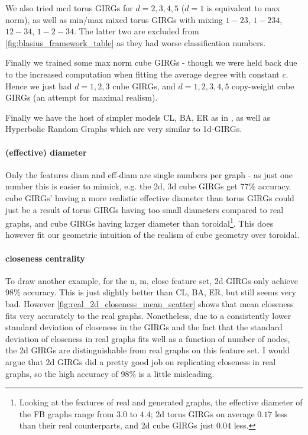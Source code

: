 We also tried mcd torus GIRGs for $d=2,3,4,5$ ($d=1$ is equivalent to max norm), as well as min/max mixed torus GIRGs with mixing $1-23$, $1-234$, $12-34$, $1-2-34$. The latter two are excluded from \cref{fig:blasius_framework_table} as they had worse classification numbers.

Finally we trained some max norm cube GIRGs - though we were held back due to the increased computation when fitting the average degree with constant $c$. Hence we just had $d=1,2,3$ cube GIRGs, and $d=1,2,3,4,5$ copy-weight cube GIRGs (an attempt for maximal realism).

Finally we have the host of simpler models CL, BA, ER as in \cite{blasius2018towards}, as well as Hyperbolic Random Graphs which are very similar to 1d-GIRGs.


\paragraph{(effective) diameter}
Only the features diam and eff-diam  are single numbers per graph - as just one number this is easier to mimick, e.g. the 2d, 3d cube GIRGs get $77\%$ accuracy. cube GIRGs' having a more realistic effective diameter than torus GIRGs could just be a result of torus GIRGs having too small diameters compared to real graphs, and cube GIRGs having larger diameter than toroidal\footnote{Looking at the features of real and generated graphs, the effective diameter of the FB graphs range from $3.0$ to $4.4$; 2d torus GIRGs on average $0.17$ less than their real counterparts, and 2d cube GIRGs just $0.04$ less.}. This does however fit our geometric intuition of the realism of cube geometry over toroidal.

\paragraph{closeness centrality}
To draw another example, for the n, m, close feature set, 2d GIRGs only achieve 98\% accuracy. This is just slightly better than CL, BA, ER, but still seems very bad. However \cref{fig:real_2d_closeness_mean_scatter} shows that mean closeness fits very accurately to the real graphs. Nonetheless, due to a consistently lower standard deviation of closeness in the GIRGs and the fact that the standard deviation of closeness in real graphs fits well as a function of number of nodes, the 2d GIRGs are distinguishable from real graphs on this feature set. I would argue that 2d GIRGs did a pretty good job on replicating closeness in real graphs, so the high accuracy of 98\% is a little misleading.

